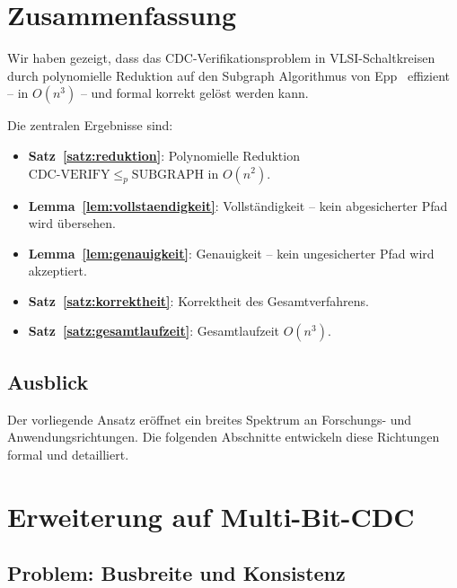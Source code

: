 ﻿\documentclass[a4paper,12pt]{article}
\theoremstyle{definition}
\begin{document}
	\section{Zusammenfassung}
	
	Wir haben gezeigt, dass das CDC-Verifikationsproblem in VLSI-Schaltkreisen
	durch polynomielle Reduktion auf den Subgraph Algorithmus von Epp~\cite{epp2026subgraph}
	effizient -- in $O(n^3)$ -- und formal korrekt gel\"ost werden kann.
	
	Die zentralen Ergebnisse sind:
	\begin{itemize}
		\item \textbf{Satz~\ref{satz:reduktion}}: Polynomielle Reduktion
		$\mathrm{CDC\text{-}VERIFY} \leq_p \mathrm{SUBGRAPH}$ in $O(n^2)$.
		\item \textbf{Lemma~\ref{lem:vollstaendigkeit}}: Vollst\"andigkeit --
		kein abgesicherter Pfad wird \"ubersehen.
		\item \textbf{Lemma~\ref{lem:genauigkeit}}: Genauigkeit -- kein
		ungesicherter Pfad wird akzeptiert.
		\item \textbf{Satz~\ref{satz:korrektheit}}: Korrektheit des
		Gesamtverfahrens.
		\item \textbf{Satz~\ref{satz:gesamtlaufzeit}}: Gesamtlaufzeit $O(n^3)$.
	\end{itemize}
	
	\subsection{Ausblick}
	
	Der vorliegende Ansatz er\"offnet ein breites Spektrum an Forschungs- und
	Anwendungsrichtungen. Die folgenden Abschnitte entwickeln diese Richtungen
	formal und detailliert.
	
	\section{Erweiterung auf Multi-Bit-CDC}
	
	\subsection{Problem: Busbreite und Konsistenz}
	
\end{document}
